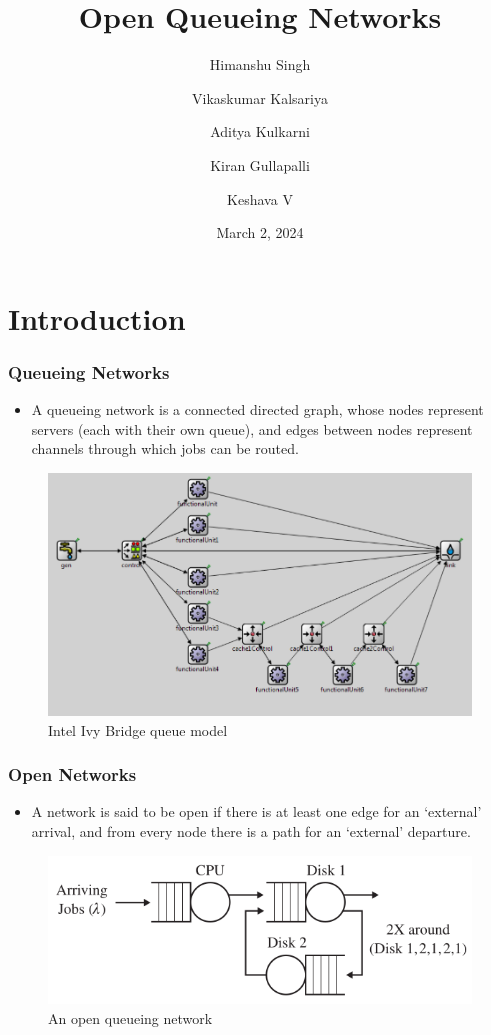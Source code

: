 \documentclass[10pt,notes]{beamer}
\title{Open Queueing Networks}
\author{Himanshu Singh \and Vikaskumar Kalsariya \and Aditya Kulkarni \and Kiran Gullapalli \and Keshava V}
\date{March 2, 2024}
\begin{document}
\begin{frame}
    \titlepage
\end{frame}

\begin{frame}
    \tableofcontents
\end{frame}

\section{Introduction}

\begin{frame}
    \frametitle{Queueing Networks}
    \begin{itemize}
        \item A queueing network is a connected directed graph, whose nodes represent servers (each with their own queue), and edges between nodes represent channels through which jobs can be routed.
    \end{itemize}
    \begin{figure}
        \includegraphics[width=0.6\linewidth]{images/ivy_bridge.png}
        \caption{Intel Ivy Bridge queue model}
    \end{figure}
\end{frame}
    
\begin{frame}
    \frametitle{Open Networks}
    \begin{itemize}
        \item A network is said to be open if there is at least one edge for an `external' arrival, and from every node there is a path for an `external' departure.
    \end{itemize}
    \begin{figure}
        \includegraphics[width=0.55\linewidth]{images/open_network.png}
        \caption{An open queueing network}
    \end{figure}
\end{frame}
\end{document}
